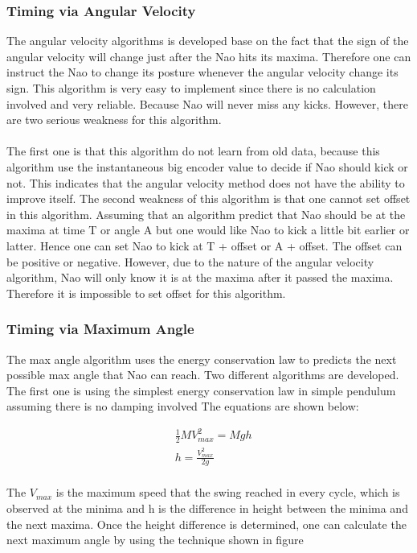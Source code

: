 \documentclass[11pt]{article}
\newcommand*\ruleline[1]{\par\noindent\raisebox{.8ex}{\makebox[\linewidth]{\hrulefill\hspace{1ex}\raisebox{-.8ex}{#1}\hspace{1ex}\hrulefill}}}
\begin{document}
\subsubsection{Timing via Angular Velocity}
\ruleline{Chenglong Li}
The angular velocity algorithms is developed base on the fact that the sign of the angular velocity will change just after the Nao hits its maxima. Therefore one can instruct the Nao to change its posture whenever the angular velocity change its sign. This algorithm is very easy to implement since there is no calculation involved and very reliable. Because Nao will never miss any kicks. However, there are two serious weakness for this algorithm. 
\\
\\
The first one is that this algorithm do not learn from old data, because this algorithm use the instantaneous big encoder value to decide if Nao should kick or not. This indicates that the angular velocity method does not have the ability to improve itself. The second weakness of this algorithm is that one cannot set offset in this algorithm. Assuming that an algorithm predict that Nao should be at the maxima at time T or angle A but one would like Nao to kick a little bit earlier or latter. Hence one can set Nao to kick at T + offset or A + offset. The offset can be positive or negative. However, due to the nature of the angular velocity algorithm, Nao will only know it is at the maxima after it passed the maxima. Therefore it is impossible to set offset for this algorithm. 

\subsubsection{Timing via Maximum Angle}
The max angle algorithm uses the energy conservation law to predicts the next possible max angle that Nao can reach. Two different algorithms are developed. The first one is using the simplest energy conservation law in simple pendulum assuming there is no damping involved The equations are shown below:

\begin{align}
    &\frac{1}{2}MV_{max}^2 = Mgh\\
    & h = \frac{V_{max}^2}{2g}\\
\end{align}

The $V_{max}$ is the maximum speed that the swing reached in every cycle, which is observed at the minima and h is the difference in height between the minima and the next maxima. Once the height difference is determined, one can calculate the next maximum angle by using the technique shown in figure
\end{document}

